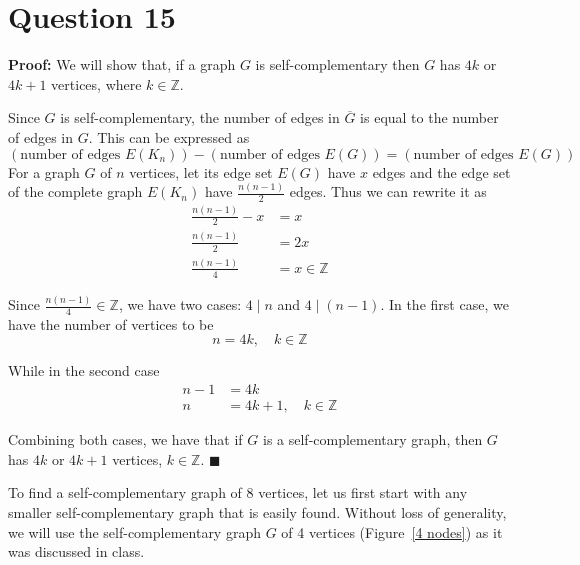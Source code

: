 \documentclass[11pt, oneside]{article}   	%
\newcommand*{\QEDA}{\hfill\ensuremath{\blacksquare}}         %
\begin{document}
{{{\section*{Question 15}

{\textbf{Proof:} We will show that, if a graph $G$ is self-complementary then $G$ has $4k$ or $4k+1$ vertices, where $k \in \mathbb{Z}$.

Since $G$ is self-complementary, the number of edges in $\overline{G}$ is equal to the number of edges in $G$. This can be expressed as
$$(\text{number of edges } E(K_n)) - (\text{number of edges } E(G)) = (\text{number of edges } E(G))$$
For a graph $G$ of $n$ vertices, let its edge set $E(G)$ have $x$ edges and the edge set of the complete graph $E(K_n)$ have $\frac{n(n-1)}{2}$ edges. Thus we can rewrite it as
\begin{align*}
\frac{n(n-1)}{2} - x  & = x\\
\frac{n(n-1)}{2} & = 2x \\
\frac{n(n-1)}{4} & = x \in \mathbb{Z}
\end{align*}


Since $\frac{n(n-1)}{4} \in \mathbb{Z}$, we have two cases: $4 \mid n$ and $4 \mid (n -1)$. In the first case, we have the number of vertices to be
$$n = 4k, \quad k \in \mathbb{Z}$$

While in the second case 
\begin{align*}
n -1 & = 4k \\
n & = 4k + 1, \quad k \in \mathbb{Z}
\end{align*}

Combining both cases, we have that if $G$ is a self-complementary graph, then $G$ has $4k$ or $4k+1$ vertices, $k \in \mathbb{Z}$. \QEDA
\cleardoublepage
	
To find a self-complementary graph of 8 vertices, let us first start with any smaller self-complementary graph that is easily found. Without loss of generality, we will use the self-complementary graph $G$ of 4 vertices (Figure~\ref{4 nodes}) as it was discussed in class.

\begin{figure}[h]
\centering

\end{figure}}}}}
\end{document}

